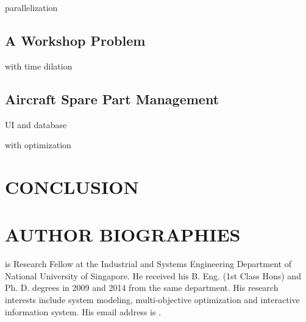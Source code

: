 \documentclass{wscpaperproc}
\theoremstyle{wsc}
\begin{document}
parallelization

\subsection{A Workshop Problem}

with time dilation

\subsection{Aircraft Spare Part Management}

UI and database

with optimization

\section{CONCLUSION}





\section*{AUTHOR BIOGRAPHIES}

 is Research Fellow at the Industrial and Systems Engineering Department of National University of Singapore. He received his B. Eng. (1st Class Hons) and Ph. D. degrees in 2009 and 2014 from the same department. His research interests include system modeling, multi-objective optimization and interactive information system. His email address is .\\
\end{document}
